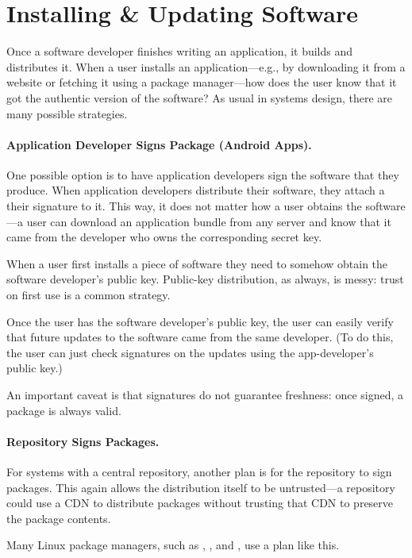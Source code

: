 \section{Installing \& Updating Software}

Once a software developer finishes writing 
an application, it builds and distributes it.
When a user installs an application---e.g., by
downloading it from a website or fetching it 
using a package manager---how does the user
know that it got the authentic version of the software?
As usual in systems design, there are many possible strategies.

\paragraph{Application Developer Signs Package (Android Apps).}
One possible option is to have application
developers sign the software that they produce.
When application developers distribute their software, 
they attach a their signature to it.
This way, it does not matter how
a user obtains the software---a user can
download an application bundle from any server and
know that it came from the developer who owns the
corresponding secret key.

When a user first installs a piece of software they
need to somehow obtain the software developer's public key.
Public-key distribution, as always, is messy: trust on 
first use is a common strategy.

Once the user has the software developer's public key,
the user can easily verify that future updates to the
software came from the same developer. (To do this,
the user can just check signatures on the updates
using the app-developer's public key.)

An important caveat is that signatures do not guarantee
freshness: once signed, a package is always valid.


\paragraph{Repository Signs Packages.}
For systems with a central repository, another plan is for the repository to sign packages. This again allows the distribution itself to be untrusted---a repository could use a CDN to distribute packages without trusting that CDN to preserve the package contents.

Many Linux package managers, such as , , and , use a plan like this.

